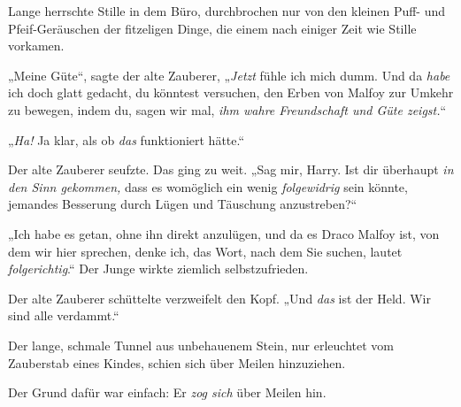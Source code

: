 Lange herrschte Stille in dem Büro, durchbrochen nur von den kleinen Puff- und Pfeif-Geräuschen der fitzeligen Dinge, die einem nach einiger Zeit wie Stille vorkamen.

„Meine Güte“, sagte der alte Zauberer,
„\emph{Jetzt} fühle ich mich dumm. Und da \emph{habe} ich doch glatt gedacht, du könntest versuchen, den Erben von Malfoy zur Umkehr zu bewegen, indem du, sagen wir mal, \emph{ihm wahre Freundschaft und Güte zeigst.}“

„\emph{Ha!} Ja klar, als ob \emph{das} funktioniert hätte.“

Der alte Zauberer seufzte. Das ging zu weit.
„Sag mir, Harry. Ist dir überhaupt \emph{in den Sinn gekommen,} dass es womöglich ein wenig \emph{folgewidrig} sein könnte, jemandes Besserung durch Lügen und Täuschung anzustreben?“

„Ich habe es getan, ohne ihn direkt anzulügen, und da es Draco Malfoy ist, von dem wir hier sprechen, denke ich, das Wort, nach dem Sie suchen, lautet \emph{folgerichtig}.“ Der Junge wirkte ziemlich selbstzufrieden.

Der alte Zauberer schüttelte verzweifelt den Kopf.
„Und \emph{das} ist der Held. Wir sind alle verdammt.“


Der lange, schmale Tunnel aus unbehauenem Stein, nur erleuchtet vom Zauberstab eines Kindes, schien sich über Meilen hinzuziehen.

Der Grund dafür war einfach: Er \emph{zog sich} über Meilen hin.


